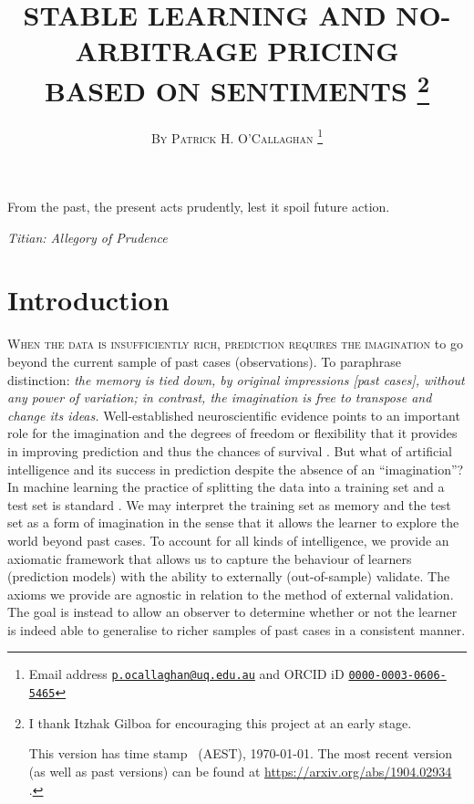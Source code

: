 \documentclass[12pt,a4paper,twoside]{article}
\title{\MakeUppercase{Stable learning and no-arbitrage pricing\\ based
on sentiments} \footnote{I thank Itzhak Gilboa for encouraging this project at
an early stage.

    This version has time stamp \currenttime~(AEST), \today. The most recent
    version (as well as past versions) can be found at
    \url{https://arxiv.org/abs/1904.02934} .}}
\author{\large\textsc{By Patrick H. O'Callaghan} \footnote{Email address
    \href{mailto:p.ocallaghan@uq.edu.au}{\texttt{p.ocallaghan@uq.edu.au}} and
    ORCID iD \href{http://orcid.org/0000-0003-0606-5465}{
      \texttt{0000-0003-0606-5465}}}}
\date{}
\begin{document}
  \maketitle
  \pagestyle{fancy}
\renewcommand{\abstractname}{\vspace{-\baselineskip}} \thispagestyle{plain}
%
\begin{abstract}
  
\end{abstract}
  \setlength{\epigraphwidth}{11.5cm} \epigraph{From the past, the
  present acts prudently, lest it spoil future action.}{\emph{Titian:  Allegory
  of Prudence} }

  \section{Introduction} \label{sec-introduction} \textsc{When the data is
  insufficiently rich, prediction requires the imagination} to go beyond the
  current sample of past cases (observations). To paraphrase \citep[pages 9 and
  10]{hume1896treatise} distinction: \emph{the memory is tied down, by original
  impressions \emph{[past cases]}, without any power of variation; in contrast,
  the imagination is free to transpose and change its ideas.} Well-established
  neuroscientific evidence points to an important role for the imagination and
  the degrees of freedom or flexibility that it provides in improving
  prediction and thus the chances of survival
  \citep{Bartlett-remembering,Sudendorf-Corballis-foresight,MM-memory-imagination-prediction}.
  But what of artificial intelligence and its success in prediction despite the
  absence of an ``imagination''? In machine learning the practice of splitting
  the data into a training set and a test set is standard
  \citet{Hastie-Tibshiriani-Statistical_learning}.  We may interpret the
  training set as memory and the test set as a form of imagination in the sense
  that it allows the learner to explore the world beyond past cases.  To
  account for all kinds of intelligence, we provide an axiomatic framework that
  allows us to capture the behaviour of learners (prediction models) with the
  ability to externally (out-of-sample) validate.  The axioms we provide are
  agnostic in relation to the method of external validation. The goal is
  instead to allow an observer to determine whether or not the learner is
  indeed able to generalise to richer samples of past cases in a consistent
  manner.
 
\end{document}
